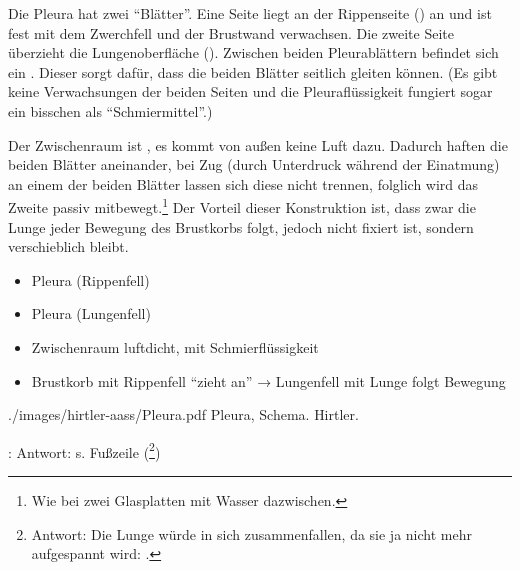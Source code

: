 {%
%
%
%
%
Die Pleura hat zwei \protect\enquote{Blätter}. Eine Seite  liegt an der
Rippenseite () an und ist fest mit dem Zwerchfell und der Brustwand
verwachsen. Die zweite Seite  überzieht die Lungenoberfläche ().
Zwischen beiden Pleurablättern befindet sich ein . Dieser
sorgt dafür, dass die beiden Blätter seitlich gleiten können. (Es gibt
keine Verwachsungen der beiden Seiten und die
Pleuraflüssigkeit fungiert sogar ein bisschen als
\protect\enquote{Schmiermittel}.)

Der Zwischenraum ist
, es kommt von außen keine Luft dazu. Dadurch haften die
beiden Blätter aneinander, bei Zug (durch Unterdruck während der Einatmung) an
einem der beiden Blätter lassen sich diese nicht trennen, folglich wird das Zweite passiv
mitbewegt.\footnote{Wie bei zwei Glasplatten mit Wasser dazwischen.} 
Der Vorteil dieser Konstruktion ist, dass zwar die Lunge jeder Bewegung des
Brustkorbs folgt, jedoch nicht fixiert ist, sondern verschieblich bleibt. 

 }
{
\begin{itemize}
    \item {} Pleura (Rippenfell)
    \item {} Pleura (Lungenfell)
    \item Zwischenraum luftdicht, mit Schmierflüssigkeit
    \item Brustkorb mit Rippenfell \protect\enquote{zieht an} → Lungenfell mit Lunge folgt
    Bewegung     
\end{itemize}
}
{./images/hirtler-aass/Pleura.pdf} {Pleura, Schema.} {Hirtler.}


:  Antwort: s. Fußzeile (\footnote{Antwort: Die Lunge
würde in sich zusammenfallen, da sie ja nicht mehr
aufgespannt wird: .})



